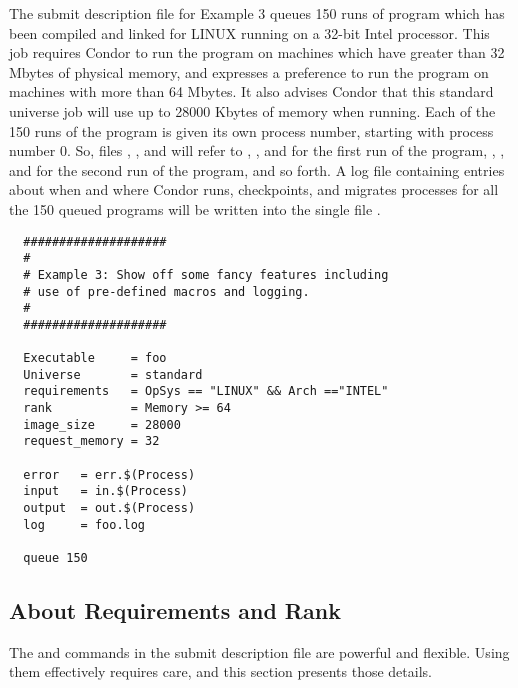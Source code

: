 The submit description file for Example 3 queues 150
runs of program  which has been compiled and linked for
LINUX running on a 32-bit Intel processor.
This job requires Condor to run the program on machines which have
greater than 32 Mbytes of physical memory, and expresses a
preference to run the program on machines with more than 64 Mbytes.
It also advises Condor that this standard universe job will
use up to 28000 Kbytes of memory when running.
Each of the 150 runs of the program is given its own process number,
starting with process number 0.
So, files 
, , and  will
refer to , , and  for the first run
of the program,
, ,
and  for the second run of the program, and so forth.
A log file containing entries
about when and where Condor runs, checkpoints, and migrates processes for
all the 150 queued programs
will be written into the single file .
\begin{verbatim}
  ####################                    
  #
  # Example 3: Show off some fancy features including
  # use of pre-defined macros and logging.
  #
  ####################                                                    

  Executable     = foo                                                    
  Universe       = standard                                                    
  requirements   = OpSys == "LINUX" && Arch =="INTEL"     
  rank           = Memory >= 64
  image_size     = 28000
  request_memory = 32

  error   = err.$(Process)                                                
  input   = in.$(Process)                                                 
  output  = out.$(Process)                                                
  log     = foo.log

  queue 150
\end{verbatim}


\subsection{\label{sec:user-man-req-and-rank}About Requirements and Rank}

The 
 and  commands in the submit description file
are powerful and flexible. 
Using them effectively requires care, and this section presents
those details.


